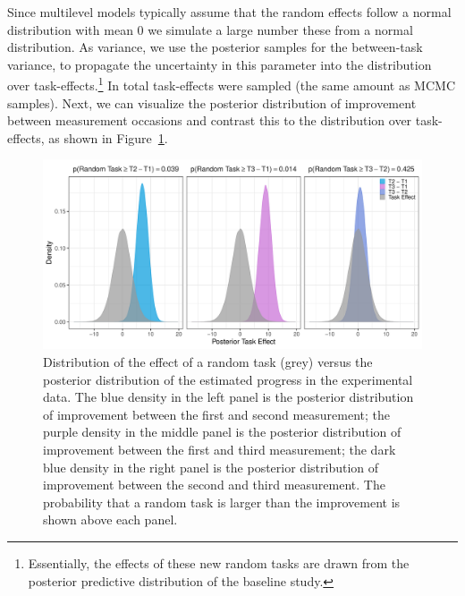 \documentclass[a4paper]{article}
\newcommand{\getValInt}[3]{%
	\pgfplotstablegetelem{#1}{#2}\of{#3}%
	\pgfmathprintnumber[fixed, fixed zerofill=false]{\pgfplotsretval}%
}
\begin{document}
Since multilevel models typically assume that the random effects follow a normal distribution with mean 0 we simulate a large number these from a normal distribution. As variance, we use the posterior samples for the between-task variance, to propagate the uncertainty in this parameter into the distribution over task-effects.\footnote{Essentially, the effects of these new random tasks are drawn from the posterior predictive distribution of the baseline study.} In total \getValInt{0}{total}{\tbMCMCsettings} task-effects were sampled (the same amount as MCMC samples). Next, we can visualize the posterior distribution of improvement between measurement occasions and contrast this to the distribution over task-effects, as shown in Figure~\ref{fig:posteriorImprovement}.
\begin{figure}[!ht]
	\centering
	\includegraphics[width=\textwidth]{compareTaskEffects.pdf}
	\caption{Distribution of the effect of a random task (grey) versus the posterior distribution of the estimated progress in the experimental data. The blue density in the left panel is the posterior distribution of improvement between the first and second measurement; the purple density in the middle panel is the posterior distribution of improvement between the first and third measurement; the dark blue density in the right panel is the posterior distribution of improvement between the second and third measurement. The probability that a random task is larger than the improvement is shown above each panel.}
	\label{fig:posteriorImprovement}
\end{figure}
\end{document}
